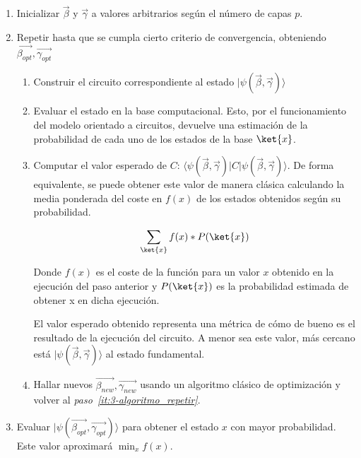 \begin{enumerate}
\item Inicializar $\vec{\beta}$ y $\vec{\gamma}$ a valores arbitrarios según el número de capas $p$.
\item\label{it:3-algoritmo_repetir}
  Repetir hasta que se cumpla cierto criterio de convergencia, obteniendo $\vec{\beta_{opt}}, \vec{\gamma_{opt}}$
  \begin{enumerate}
  \item\label{it:3-algoritmo_construir_circuito} Construir el circuito correspondiente al estado $\lvert \psi(\vec{\beta}, \vec{\gamma})\rangle$

  \item\label{it:3-algoritmo_ejecutar_circuito}
    Evaluar el estado en la base computacional.
    Esto, por el funcionamiento del modelo orientado a circuitos, devuelve una estimación de la probabilidad de cada uno de los estados de la base $\ket{x}$.

  \item\label{it:3-algoritmo_valor_esperado}
    Computar el valor esperado de $C$: $\langle \psi(\vec{\beta}, \vec{\gamma}) \rvert C \lvert \psi(\vec{\beta}, \vec{\gamma}) \rangle$.
    De forma equivalente, se puede obtener este valor de manera clásica calculando la media ponderada del coste en $f(x)$ de los estados obtenidos según su probabilidad.

    \begin{align}
      \sum_{\ket{x}} f(x)*P(\ket{x})
    \end{align}

    Donde $f(x)$ es el coste de la función para un valor $x$ obtenido en la ejecución del paso anterior y $P(\ket{x})$ es la probabilidad estimada de obtener x en dicha ejecución.

    El valor esperado obtenido representa una métrica de cómo de bueno es el resultado de la ejecución del circuito.
    A menor sea este valor, más cercano está $\lvert \psi(\vec{\beta}, \vec{\gamma})\rangle$ al estado fundamental.

  \item Hallar nuevos $\vec{\beta_{new}}, \vec{\gamma_{new}}$ usando un algoritmo clásico de optimización y volver al \textit{paso~\ref{it:3-algoritmo_repetir}}.
  \end{enumerate}

\item Evaluar $\lvert \psi(\vec{\beta_{opt}}, \vec{\gamma_{opt}}) \rangle$ para obtener el estado $x$ con mayor probabilidad.
  Este valor aproximará $\min_{x}f(x)$.

\end{enumerate}

